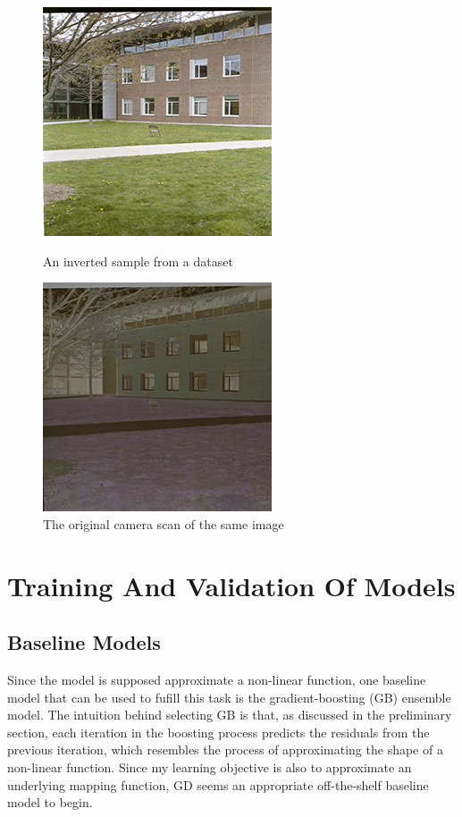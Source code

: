 \documentclass[twoside,11pt]{article}
\begin{document}
\begin{figure}
	\centering
	\includegraphics[width=0.6\linewidth]{validate_inverted.png}
	\caption{An inverted sample from a dataset}
	\includegraphics[width=0.6\linewidth]{validate.png}
	\caption{The original camera scan of the same image}
	\label{fig:dataset}
\end{figure}


\section{Training And Validation Of Models}
\label{sec:methods}
\subsection{Baseline Models}
Since the model is supposed approximate a non-linear function, one baseline model that can be used to fufill this task is the gradient-boosting (GB) ensemble model. 
The intuition behind selecting GB is that, as discussed in the preliminary section, each iteration in the boosting process predicts the residuals from the previous iteration, 
which resembles the process of approximating the shape of a non-linear function. Since my learning objective is also to approximate an underlying mapping function, 
GD seems an appropriate off-the-shelf baseline model to begin.
\end{document}
